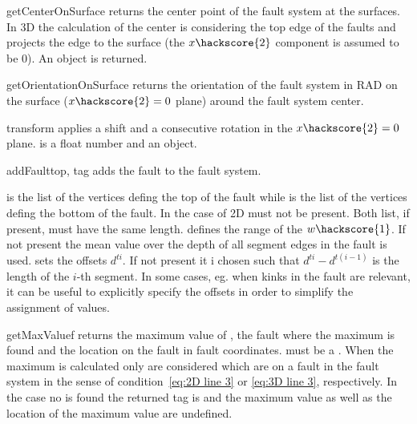 \begin{methoddesc}[FaultSystem]{getCenterOnSurface}{}
returns the center point of the fault system at the surfaces. In 3D the calculation of the center is
considering the top edge of the faults and projects the edge to the surface (the $x\hackscore{2}$ component is assumed to be 0). An \numpyNDA object is returned.
\end{methoddesc}

\begin{methoddesc}[FaultSystem]{getOrientationOnSurface}{}
returns the orientation of the fault system in RAD on the surface ($x\hackscore{2}=0$ plane) around the fault system center.
\end{methoddesc}
\begin{methoddesc}[FaultSystem]{transform}{}
applies a shift  and a consecutive rotation in the $x\hackscore{2}=0$ plane.
 is a float number and  an \numpyNDA object.
\end{methoddesc}

\begin{methoddesc}[FaultSystem]{addFault}{top, tag }
adds the  fault  to the fault system. 

 is the list of the vertices defing the top of the fault
while  is the list of the vertices defing the bottom of the fault.
In the case of 2D  must not be present. Both list, if present, must have the same length.
 defines the range of the $w\hackscore{1}$. If not present the mean value over the depth of 
all segment edges in the fault is used.
 sets the offsets $d^{ti}$. If not present it i chosen such that $d^{ti}-d^{t(i-1)}$ is the length of the $i$-th segment. In some cases, eg. when kinks in the fault are relevant, it can be useful
to explicitly specify the offsets in order to simplify the assignment of values.
\end{methoddesc}

\begin{methoddesc}[FaultSystem]{getMaxValue}{f}
returns the maximum value of , the fault where the maximum is found and the location on the fault in fault coordinates.  must be a \Scalar. When the maximum is calculated only \DataSamplePoints are considered
which are on a fault in the fault system in the sense of condition~\ref{eq:2D line 3} or \ref{eq:3D line 3}, respectively. In the case no \DataSamplePoints is found the returned tag is  and
the maximum value as well as the location of the maximum value are undefined.
\end{methoddesc}

